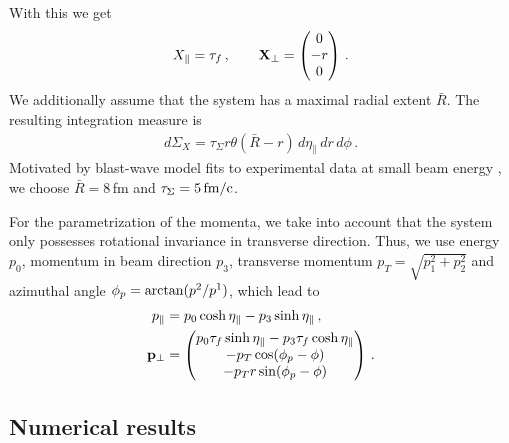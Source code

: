 \documentclass[reprint,superscriptaddress,english,preprintnumbers,amsmath,amssymb,aps,prx]{revtex4-2}
\begin{document}
With this we get
\begin{align}
X_\parallel = \tau_f\,,\qquad
\bold{X}_\perp =\begin{pmatrix} 0 \\ -r \\ 0 \end{pmatrix}\,.
\end{align}
We additionally assume that the system has a maximal radial extent $\bar R$. The resulting integration measure is
\begin{align}
d\Sigma_X = \tau_\Sigma r\theta(\bar R-r)\, d\eta_\parallel\,dr\, d\phi\,. 
\end{align}
Motivated by blast-wave model fits to experimental data at small beam energy \cite{Zhang:2016tbf}, we choose $\bar R = 8$\,fm and $\tau_\Sigma = 5\, {\rm fm/c}$.

For the parametrization of the momenta, we take into account that the system only possesses rotational invariance in transverse direction. Thus, we use energy $p_0$, momentum in beam direction $p_3$, transverse momentum $p_T = \sqrt{p_1^2+p_2^2}$ and azimuthal angle $\phi_p = {\rm arctan}(p^2/p^1)$, which lead to
\begin{align}\label{eq:mompar}
\begin{split}
p_\parallel &= p_0 \cosh\eta_\parallel -p_3 \sinh\eta_\parallel\,,\\
\bold{p}_\perp &= 
\begin{pmatrix}
p_0 \tau_f \sinh\eta_\parallel-p_3 \tau_f \cosh\eta_\parallel\\
-p_T \cos(\phi_p -\phi)\\
-p_T r \sin(\phi_p -\phi)
\end{pmatrix}\,.
\end{split}
\end{align}









\subsection{Numerical results}\label{sec:res}
\end{document}

